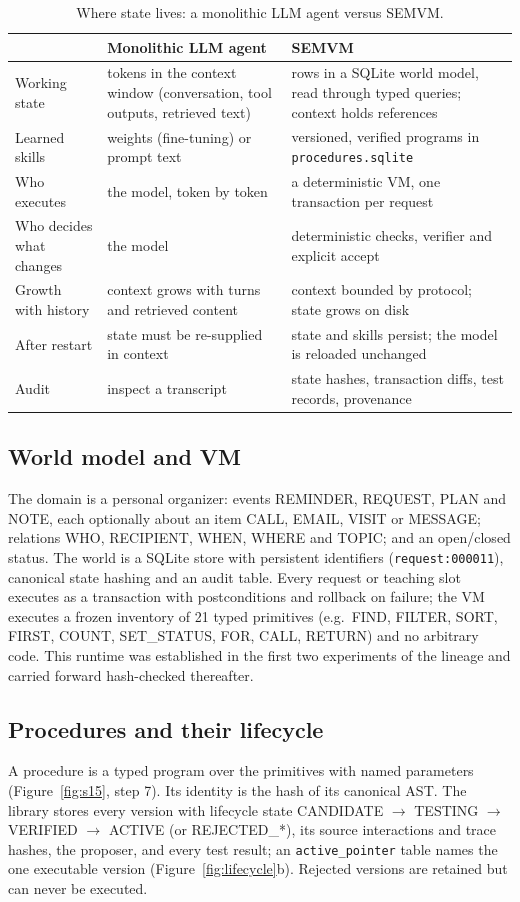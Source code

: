 \documentclass[10pt]{article}
\newcommand{\id}[1]{\nolinkurl{#1}}
\newcommand{\semvm}{SEMVM}
\begin{document}
\begin{table}[t]
\centering\small
\caption{Where state lives: a monolithic LLM agent versus \semvm.}
\label{tab:monolithic}
\begin{tabularx}{\linewidth}{@{}>{\raggedright}p{3.1cm}>{\raggedright}X>{\raggedright\arraybackslash}X@{}}
\toprule
 & Monolithic LLM agent & \semvm \\
\midrule
Working state & tokens in the context window (conversation, tool outputs, retrieved text) & rows in a SQLite world model, read through typed queries; context holds references \\
Learned skills & weights (fine-tuning) or prompt text & versioned, verified programs in \id{procedures.sqlite} \\
Who executes & the model, token by token & a deterministic VM, one transaction per request \\
Who decides what changes & the model & deterministic checks, verifier and explicit accept \\
Growth with history & context grows with turns and retrieved content & context bounded by protocol; state grows on disk \\
After restart & state must be re-supplied in context & state and skills persist; the model is reloaded unchanged \\
Audit & inspect a transcript & state hashes, transaction diffs, test records, provenance \\
\bottomrule
\end{tabularx}
\end{table}

\subsection{World model and VM}
The domain is a personal organizer: events REMINDER, REQUEST, PLAN and NOTE, each optionally about an item CALL, EMAIL, VISIT or MESSAGE; relations WHO, RECIPIENT, WHEN, WHERE and TOPIC; and an open/closed status. The world is a SQLite store with persistent identifiers (\id{request:000011}), canonical state hashing and an audit table. Every request or teaching slot executes as a transaction with postconditions and rollback on failure; the VM executes a frozen inventory of 21 typed primitives (e.g.\ FIND, FILTER, SORT, FIRST, COUNT, SET\_STATUS, FOR, CALL, RETURN) and no arbitrary code. This runtime was established in the first two experiments of the lineage and carried forward hash-checked thereafter.

\subsection{Procedures and their lifecycle}
A procedure is a typed program over the primitives with named parameters (Figure~\ref{fig:s15}, step 7). Its identity is the hash of its canonical AST. The library stores every version with lifecycle state CANDIDATE $\rightarrow$ TESTING $\rightarrow$ VERIFIED $\rightarrow$ ACTIVE (or REJECTED\_*), its source interactions and trace hashes, the proposer, and every test result; an \id{active_pointer} table names the one executable version (Figure~\ref{fig:lifecycle}b). Rejected versions are retained but can never be executed.
\end{document}

